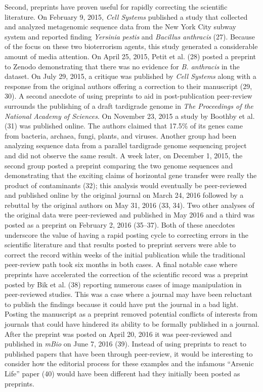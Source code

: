 \documentclass[11pt,]{article}
\begin{document}
Second, preprints have proven useful for rapidly correcting the
scientific literature. On February 9, 2015, \emph{Cell Systems}
published a study that collected and analyzed metagenomic sequence data
from the New York City subway system and reported finding \emph{Yersinia
pestis} and \emph{Bacillus anthracis} (27). Because of the focus on
these two bioterrorism agents, this study generated a considerable
amount of media attention. On April 25, 2015, Petit et al. (28) posted a
preprint to Zenodo demonstrating that there was no evidence for \emph{B.
anthracis} in the dataset. On July 29, 2015, a critique was published by
\emph{Cell Systems} along with a response from the original authors
offering a correction to their manuscript (29, 30). A second anecdote of
using preprints to aid in post-publication peer-review surrounds the
publishing of a draft tardigrade genome in \emph{The Proceedings of the
National Academy of Sciences}. On November 23, 2015 a study by Boothby
et al. (31) was published online. The authors claimed that 17.5\% of its
genes came from bacteria, archaea, fungi, plants, and viruses. Another
group had been analyzing sequence data from a parallel tardigrade genome
sequencing project and did not observe the same result. A week later, on
December 1, 2015, the second group posted a preprint comparing the two
genome sequences and demonstrating that the exciting claims of
horizontal gene transfer were really the product of contaminants (32);
this analysis would eventually be peer-reviewed and published online by
the original journal on March 24, 2016 followed by a rebuttal by the
original authors on May 31, 2016 (33, 34). Two other analyses of the
original data were peer-reviewed and published in May 2016 and a third
was posted as a preprint on February 2, 2016 (35--37). Both of these
anecdotes underscore the value of having a rapid posting cycle to
correcting errors in the scientific literature and that results posted
to preprint servers were able to correct the record within weeks of the
initial publication while the traditional peer-review path took six
months in both cases. A final notable case where preprints have
accelerated the correction of the scientific record was a preprint
posted by Bik et al. (38) reporting numerous cases of image manipulation
in peer-reviewed studies. This was a case where a journal may have been
reluctant to publish the findings because it could have put the journal
in a bad light. Posting the manuscript as a preprint removed potential
conflicts of interests from journals that could have hindered its
ability to be formally published in a journal. After the preprint was
posted on April 20, 2016 it was peer-reviewed and published in
\emph{mBio} on June 7, 2016 (39). Instead of using preprints to react to
published papers that have been through peer-review, it would be
interesting to consider how the editorial process for these examples and
the infamous ``Arsenic Life'' paper (40) would have been different had
they initially been posted as preprints.
\end{document}
